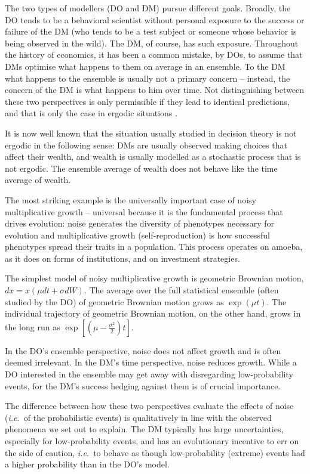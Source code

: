 \documentclass[a4paper, 12pt]{article}
\newcommand{\ie}{{\it i.e.}\ }
\begin{document}
The two types of modellers (DO and DM) pursue different goals. Broadly, the DO tends to be a behavioral scientist without personal exposure to the success or failure of the DM (who tends to be a test subject or someone whose behavior is being observed in the wild). The DM, of course, has such exposure. Throughout the history of economics, it has been a common mistake, by DOs, to assume that DMs optimise what happens to them on average in an ensemble. To the DM what happens to the ensemble is usually not a primary concern -- instead, the concern of the DM is what happens to him over time. Not distinguishing between these two perspectives is only permissible if they lead to identical predictions, and that is only the case in ergodic situations \citep{Peters2019b}. 

It is now well known that the situation usually studied in decision theory is not ergodic in the following sense: DMs are usually observed making choices that affect their wealth, and wealth is usually modelled as a stochastic process that is not ergodic. The ensemble average of wealth does not behave like the time average of wealth.

The most striking example is the universally important case of noisy multiplicative growth -- universal because it is the fundamental process that drives evolution: noise generates the diversity of phenotypes necessary for evolution and multiplicative growth (self-reproduction) is how successful phenotypes spread their traits in a population. This process operates on amoeba, as it does on forms of institutions, and on investment strategies.

The simplest model of noisy multiplicative growth is geometric Brownian motion, $dx=x(\mu dt+\sigma dW)$. The average over the full statistical ensemble (often studied by the DO) of geometric Brownian motion grows as $\exp(\mu t)$. The individual trajectory of geometric Brownian motion, on the other hand, grows in the long run as $\exp[(\mu-\frac{\sigma^2}{2})t]$.

In the DO's ensemble perspective, noise does not affect growth and is often deemed irrelevant. In the DM's time perspective, noise reduces growth. While a DO interested in the ensemble may get away with disregarding low-probability events, for the DM's success hedging against them is of crucial importance.

The difference between how these two perspectives evaluate the effects of noise (\ie of the probabilistic events) is qualitatively in line with the observed phenomena we set out to explain. The DM typically has large uncertainties, especially for low-probability events, and has an evolutionary incentive to err on the side of caution, \ie to behave as though low-probability (extreme) events had a higher probability than in the DO's model.
\end{document}
